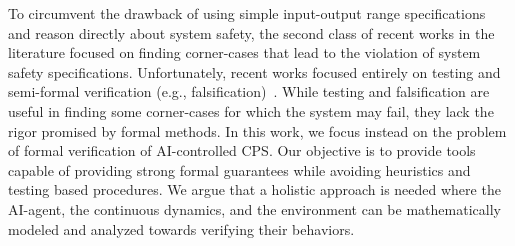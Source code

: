 To circumvent the drawback of using simple input-output range specifications and reason directly about system safety, the second class of recent works in the literature focused on finding corner-cases that lead to the violation of system safety specifications. Unfortunately, recent works focused entirely on testing and semi-formal verification (e.g., falsification)~\cite{pei2017deepxplore,tian2017deeptest,wicker2018feature,YouchengTesting2018,LeiDeepGauge2018,Wang2018Testing,LeiDeepMutation2018,srisakaokul2018multiple,MengshiDeepRoad2018,YouchengConcolic2018,dreossi2017compositional}. While testing and falsification are useful in finding some corner-cases for which the system may fail, they lack the rigor promised by formal methods.
In this work, we focus instead on the problem of formal verification of AI-controlled CPS. Our objective is to provide tools capable of providing strong formal guarantees while avoiding heuristics and testing based procedures. We argue that a holistic approach is needed where the AI-agent, the continuous dynamics, and the environment can be mathematically modeled and analyzed towards verifying their behaviors.
